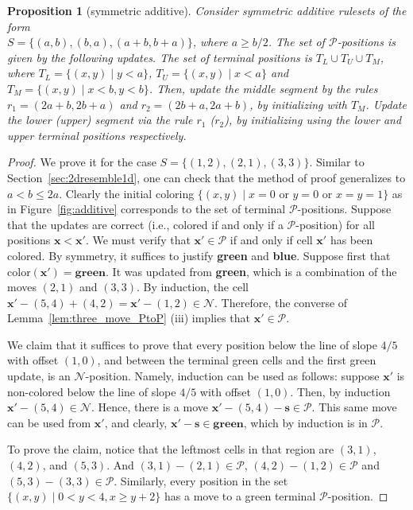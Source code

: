 \documentclass{amsart}
\theoremstyle{plain}
\newtheorem{prop}[thm]{Proposition}
\theoremstyle{definition}
\newcommand{\N}{\ensuremath{\mathcal N}}
\renewcommand{\P}{\ensuremath{\mathcal P}}
\newcommand{\x}{\boldsymbol x}
\newcommand{\s}{\boldsymbol s}
\renewcommand{\ge}{\geqslant}
\renewcommand{\le}{\leqslant}
\begin{document}
\begin{prop}[{\sc symmetric additive}]\label{prop:symadd}
    Consider symmetric additive rulesets of the form \\
    $S=\{(a,b),(b,a),(a+b,b+a)\}$,
    where $a\ge b/2$.  The set of $\P$-positions is given by the following updates. The set of terminal positions is $T_L\cup T_U\cup T_M$, where $T_L=\{(x,y)\mid y<a\}$, $T_U=\{(x,y)\mid x<a\}$ and $T_M=\{(x,y)\mid x< b, y< b\}$. Then, update the middle segment by the rules $r_1=(2a+b,2b+a)$ and $r_2=(2b+a,2a+b)$, by initializing with $T_M$. Update the lower (upper) segment via the rule $r_1$ ($r_2$), by initializing using the lower and upper terminal positions respectively.  
\end{prop}
\begin{proof}
We prove it for the case $S=\{(1,2),(2,1),(3,3)\}$. Similar to Section~\ref{sec:2dresemble1d}, one can check that the method of proof generalizes to $a<b\le 2a$. Clearly the initial coloring $\{(x,y) \mid x=0 \text{ or } y=0  \text{ or } x=y=1\}$ as in Figure~\ref{fig:additive} corresponds to the set of terminal \P-positions. Suppose that the updates are correct (i.e., colored if and only if a \P-position) for all positions $\x<\x'$. We must verify that $\x'\in\P$ if and only if cell $\x'$ has been colored. By symmetry, it suffices to justify {\bf green} and {\bf blue}. Suppose first that $\mathrm{color}(\x')=\mathbf{green}$. It was updated from {\bf green}, which is a combination of the moves $(2,1)$ and $(3,3)$. By induction, the cell $\x'-(5,4)+(4,2)=\x'-(1,2)\in \N$. Therefore, the converse of Lemma~\ref{lem:three_move_PtoP} (iii) implies that $\x'\in\P$. 

We claim that it suffices to prove that every position below the line of slope $4/5$ with offset $(1,0)$, and between the terminal green cells and the first green update, is an $\N$-position. Namely, induction can be used as follows: suppose $\x'$ is non-colored below the line of slope $4/5$ with offset $(1,0)$. Then, by induction $\x'-(5,4)\in \N$. Hence, there is a move  $\x'-(5,4)-\s\in \P$. This same move can be used from $\x'$, and clearly, $\x'-\s\in \mathbf{green}$, which by induction is in \P. 

To prove the claim, notice that the leftmost cells in that region are $(3,1)$, $(4,2)$, and $(5,3)$. And $(3,1)-(2,1)\in \P$, $(4,2)-(1,2)\in \P$ and $(5,3)-(3,3)\in\P$. Similarly, every position in the set $\{(x,y) \mid 0<y<4, x\ge y+2\}$ has a move to a green terminal \P-position.


\end{proof}
\end{document}
